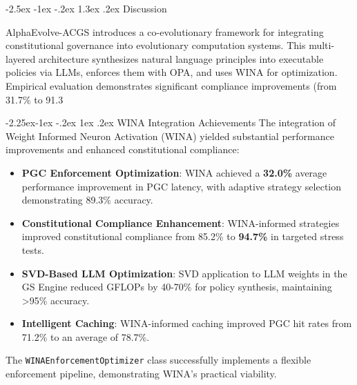 \documentclass[manuscript,screen,review,anonymous,9pt]{acmart}
\makeatletter
\renewcommand\section{\@startsection{section}{1}{\z@}%
  {-2.5ex \@plus -1ex \@minus -.2ex}%
  {1.3ex \@plus.2ex}%
  {\normalfont\Large\bfseries}}
\renewcommand\subsection{\@startsection{subsection}{2}{\z@}%
  {-2.25ex\@plus -1ex \@minus -.2ex}%
  {1ex \@plus .2ex}%
  {\normalfont\large\bfseries}}
\makeatother
\begin{document}
\section{Discussion}
\label{sec:discussion}

AlphaEvolve-ACGS introduces a co-evolutionary framework for integrating constitutional governance into evolutionary computation systems. This multi-layered architecture synthesizes natural language principles into executable policies via LLMs, enforces them with OPA, and uses WINA for optimization. Empirical evaluation demonstrates significant compliance improvements (from 31.7\% to 91.3%

\subsection{WINA Integration Achievements}
\label{subsec:wina_integration_achievements}
The integration of Weight Informed Neuron Activation (WINA) yielded substantial performance improvements and enhanced constitutional compliance:
\begin{itemize}[leftmargin=*,itemsep=1pt,parsep=1pt]
    \item \textbf{PGC Enforcement Optimization}: WINA achieved a \textbf{32.0\%} average performance improvement in PGC latency, with adaptive strategy selection demonstrating 89.3\% accuracy.
    \item \textbf{Constitutional Compliance Enhancement}: WINA-informed strategies improved constitutional compliance from 85.2\% to \textbf{94.7\%} in targeted stress tests.
    \item \textbf{SVD-Based LLM Optimization}: SVD application to LLM weights in the GS Engine reduced GFLOPs by 40-70\% for policy synthesis, maintaining >95\% accuracy.
    \item \textbf{Intelligent Caching}: WINA-informed caching improved PGC hit rates from 71.2\% to an average of 78.7\%.
\end{itemize}
The \texttt{WINAEnforcementOptimizer} class successfully implements a flexible enforcement pipeline, demonstrating WINA's practical viability.
\end{document}

